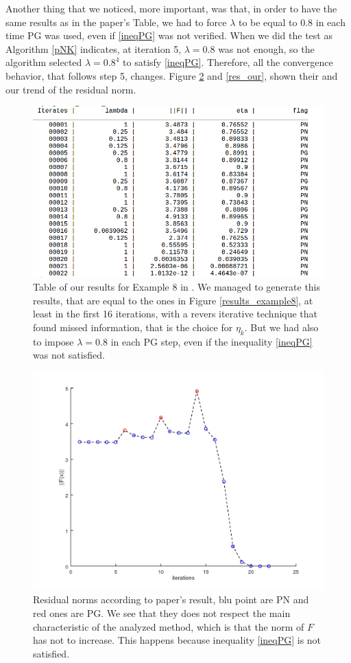 Another thing that we noticed, more important, was that, in order to have the same results as in the paper's Table, we had to force $ \lambda $ to be equal to $ 0.8 $ in each time PG was used, even if \eqref{ineqPG} was not verified. When we did the test as Algorithm \ref{pNK} indicates, at iteration 5, $ \lambda = 0.8 $ was not enough, so the algorithm selected $ \lambda = 0.8^4 $ to satisfy \eqref{ineqPG}. Therefore, all the convergence behavior, that follows step 5, changes. Figure \ref{res_paper} and \ref{res_our}, shown their and our trend of the residual norm.\\
\begin{figure}[h]
	\centering
	\includegraphics[width=1\linewidth]{ourresults8}
	\caption[Table of our results for example 8 in \cite{MAIN}]{Table of our results for Example 8 in \cite{MAIN}. We managed to generate this results, that are equal to the ones in Figure \ref{results_example8}, at least in the first 16 iterations, with a revers iterative technique that found missed information, that is the choice for $ \eta_k $. But we had also to impose $ \lambda = 0.8 $ in each PG step, even if the inequality \eqref{ineqPG} was not satisfied.}
	\label{our_example8}
\end{figure}
\begin{figure}[h]
	\centering
	\includegraphics[width=0.8\linewidth]{res_paper}
	\caption[Plot of residuals found in \cite{MAIN}]{Residual norms according to paper's result, blu point are PN and red ones are PG. We see that they does not respect the main characteristic of the analyzed method, which is that the norm of $ F $ has not to increase. This happens because inequality \eqref{ineqPG} is not satisfied.}
	\label{res_paper}
\end{figure}
